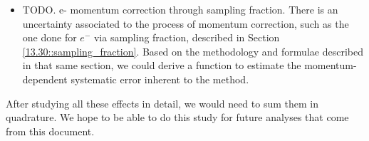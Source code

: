 \begin{itemize}
        \item
            TODO. e- momentum correction through sampling fraction.
            There is an uncertainty associated to the process of momentum correction, such as the one done for $e^-$ via sampling fraction, described in Section \ref{13.30::sampling_fraction}.
            Based on the methodology and formulae described in that same section, we could derive a function to estimate the momentum-dependent systematic error inherent to the method.
    \end{itemize}

    After studying all these effects in detail, we would need to sum them in quadrature.
    We hope to be able to do this study for future analyses that come from this document.
